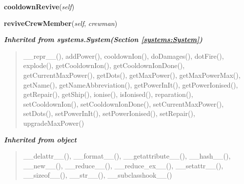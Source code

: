     \label{systems:CloneBay:cooldownRevive}

    \vspace{0.5ex}

\hspace{.8\funcindent}\begin{boxedminipage}{\funcwidth}

    \raggedright \textbf{cooldownRevive}(\textit{self})

\setlength{\parskip}{2ex}
\setlength{\parskip}{1ex}
    \end{boxedminipage}

    \label{systems:CloneBay:reviveCrewMember}

    \vspace{0.5ex}

\hspace{.8\funcindent}\begin{boxedminipage}{\funcwidth}

    \raggedright \textbf{reviveCrewMember}(\textit{self}, \textit{crewman})

\setlength{\parskip}{2ex}
\setlength{\parskip}{1ex}
    \end{boxedminipage}


\large{\textbf{\textit{Inherited from systems.System\textit{(Section \ref{systems:System})}}}}

\begin{quote}
\_\_repr\_\_(), addPower(), cooldownIon(), doDamages(), dotFire(), explode(), getCooldownIon(), getCooldownIonDone(), getCurrentMaxPower(), getDots(), getMaxPower(), getMaxPowerMax(), getName(), getNameAbbreviation(), getPowerInIt(), getPowerIonised(), getRepair(), getShip(), ionise(), isIonised(), reparation(), setCooldownIon(), setCooldownIonDone(), setCurrentMaxPower(), setDots(), setPowerInIt(), setPowerIonised(), setRepair(), upgradeMaxPower()
\end{quote}

\large{\textbf{\textit{Inherited from object}}}

\begin{quote}
\_\_delattr\_\_(), \_\_format\_\_(), \_\_getattribute\_\_(), \_\_hash\_\_(), \_\_new\_\_(), \_\_reduce\_\_(), \_\_reduce\_ex\_\_(), \_\_setattr\_\_(), \_\_sizeof\_\_(), \_\_str\_\_(), \_\_subclasshook\_\_()
\end{quote}

